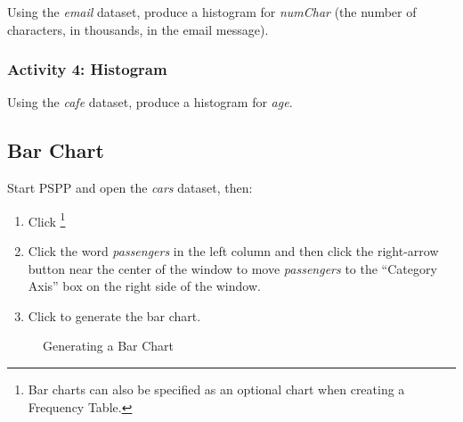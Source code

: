 Using the \textit{email} dataset, produce a histogram for \textit{numChar} (the number of characters, in thousands, in the email message).

\subsubsection{Activity 4: Histogram} \label{lab02_act04}

Using the \textit{cafe} dataset, produce a histogram for \textit{age}.

\subsection{Bar Chart}

Start \acs{PSPP} and open the \textit{cars} dataset, then:

\begin{enumerate}
  \item Click \textsc{}\footnote{Bar charts can also be specified as an optional chart when creating a Frequency Table.}
  \item Click the word \textit{passengers} in the left column and then click the right-arrow button near the center of the window to move \textit{passengers} to the ``Category Axis'' box on the right side of the window.
  \item Click  to generate the bar chart.
\end{enumerate}

\begin{figure}[H]
  \begin{center}
    \caption{Generating a Bar Chart}
    \label{lab02_fig17}
  \end{center}
\end{figure}

